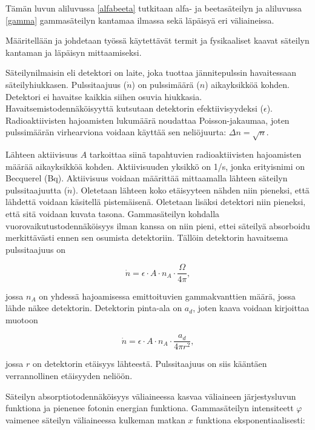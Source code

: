 \documentclass[a4paper,11pt]{article}
\begin{document}
Tämän luvun aliluvussa \ref{alfabeeta} tutkitaan alfa- ja beetasäteilyn ja aliluvussa \ref{gamma} gammasäteilyn kantamaa ilmassa sekä läpäisyä eri väliaineissa. 

Määritellään ja johdetaan työssä käytettävät termit ja fysikaaliset kaavat säteilyn kantaman ja läpäisyn mittaamiseksi. 

Säteilynilmaisin eli detektori on laite, joka tuottaa jännitepulssin havaitessaan säteilyhiukkasen. Pulssitaajuus ($\dot{n}$) on pulssimäärä ($n$) aikayksikköä kohden. Detektori ei havaitse kaikkia siihen osuvia hiukkasia. Havaitsemistodennäköisyyttä kutsutaan detektorin efektiivisyydeksi ($\epsilon$). Radioaktiivisten hajoamisten lukumäärä noudattaa Poisson-jakaumaa, joten pulssimäärän virhearviona voidaan käyttää sen neliöjuurta: $\Delta n = \sqrt{n}$.

Lähteen aktiivisuus $A$ tarkoittaa siinä tapahtuvien radioaktiivisten hajoamisten määrää aikayksikköä kohden. Aktiivisuuden yksikkö on 1/s, jonka erityisnimi on Becquerel (Bq). Aktiivisuus voidaan määrittää mittaamalla lähteen säteilyn pulssitaajuutta ($\dot{n}$). Oletetaan lähteen koko etäisyyteen nähden niin pieneksi, että lähdettä voidaan käsitellä pistemäisenä. Oletetaan lisäksi detektori niin pieneksi, että sitä voidaan kuvata tasona. Gammasäteilyn kohdalla vuorovaikutustodennäköisyys ilman kanssa on niin pieni, ettei säteilyä absorboidu merkittävästi ennen sen osumista detektoriin. Tällöin detektorin havaitsema pulssitaajuus on 

\begin{equation}
  \dot{n} = \epsilon \cdot A \cdot n_A \cdot \frac{\Omega}{4 \pi} ,
\end{equation}

jossa $n_A$ on yhdessä hajoamisessa emittoituvien gammakvanttien määrä, jossa lähde näkee detektorin. Detektorin pinta-ala on $a_d$, joten kaava voidaan kirjoittaa muotoon

\begin{equation}
  \dot{n} = \epsilon \cdot A \cdot n_A \cdot \frac{a_d}{4 \pi r^2} ,
\end{equation}

jossa $r$ on detektorin etäisyys lähteestä. Pulssitaajuus on siis kääntäen verrannollinen etäisyyden neliöön. 

Säteilyn absorptiotodennäköisyys väliaineessa kasvaa väliaineen järjestysluvun funktiona ja pienenee fotonin energian funktiona. Gammasäteilyn intensiteett $\varphi$ vaimenee säteilyn väliaineessa kulkeman matkan $x$ funktiona eksponentiaalisesti:
\end{document}
